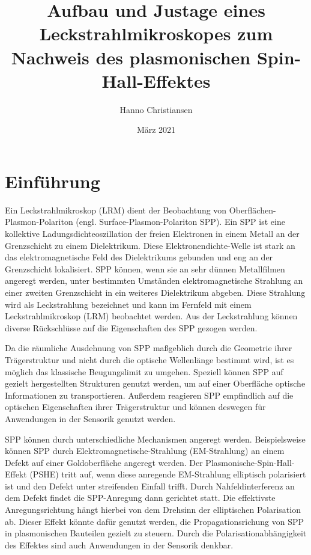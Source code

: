 \documentclass[titlepage]{article}
\title{Aufbau und Justage eines Leckstrahlmikroskopes zum Nachweis des plasmonischen Spin-Hall-Effektes}
\author{Hanno Christiansen}
\date{März 2021}
\begin{document}
	
\maketitle
\tableofcontents
\newpage

\section{Einführung}
Ein Leckstrahlmikroskop (LRM) dient der Beobachtung von Oberflächen-Plasmon-Polariton (engl. Surface-Plasmon-Polariton SPP). Ein SPP ist eine kollektive Ladungsdichteoszillation der freien Elektronen in einem Metall an der Grenzschicht zu einem Dielektrikum. Diese Elektronendichte-Welle ist stark an das elektromagnetische Feld des Dielektrikums gebunden und eng an der Grenzschicht lokalisiert. SPP können, wenn sie an sehr dünnen Metallfilmen angeregt werden, unter bestimmten Umständen elektromagnetische Strahlung an einer zweiten Grenzschicht in ein weiteres Dielektrikum abgeben. Diese Strahlung wird als Leckstrahlung bezeichnet und kann im Fernfeld mit einem Leckstrahlmikroskop (LRM) beobachtet werden. Aus der Leckstrahlung können diverse Rückschlüsse auf die Eigenschaften des SPP gezogen werden.\cite{Drezet.2008}

Da die räumliche Ausdehnung von SPP maßgeblich durch die Geometrie ihrer Trägerstruktur und nicht durch die optische Wellenlänge bestimmt wird, ist es möglich das klassische Beugungslimit zu umgehen. Speziell können SPP auf gezielt hergestellten Strukturen genutzt werden, um auf einer Oberfläche optische Informationen zu transportieren. Außerdem reagieren SPP empfindlich auf die optischen Eigenschaften ihrer Trägerstruktur und können deswegen für Anwendungen in der Sensorik genutzt werden.\cite{Lin.2013}

SPP können durch unterschiedliche Mechanismen angeregt werden. Beispielsweise können SPP durch Elektromagnetische-Strahlung (EM-Strahlung) an einem Defekt auf einer Goldoberfläche angeregt werden. Der Plasmonische-Spin-Hall-Effekt (PSHE) tritt auf, wenn diese anregende EM-Strahlung elliptisch polarisiert ist und den Defekt unter streifenden Einfall trifft. Durch Nahfeldinterferenz an dem Defekt findet die SPP-Anregung dann gerichtet statt. Die effektivste Anregungsrichtung hängt hierbei von dem Drehsinn der elliptischen Polarisation ab. Dieser Effekt könnte dafür genutzt werden, die Propagationsrichung von SPP in plasmonischen Bauteilen gezielt zu steuern. Durch die Polarisationabhängigkeit des Effektes sind auch Anwendungen in der Sensorik denkbar.\cite{RodriguezFortuno.2013}
\end{document}
